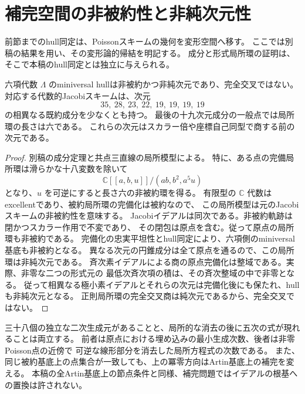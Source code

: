 \section{補完空間の非被約性と非純次元性}
\label{sec:ambient-geometry-consequences-v32}

前節までのhull同定は、Poissonスキームの幾何を変形空間へ移す。
ここでは別稿\cite{VKPoisson32}の結果を用い、その変形論的帰結を明記する。
成分と形式局所環の証明は、そこで本稿のhull同定とは独立に与えられる。

\begin{corollary}[非被約な六項補完空間]
\label{cor:ambient-nonreduced-v32}
六項代数 $\Lambda$ のminiversal hullは非被約かつ非純次元であり、完全交叉ではない。
対応する代数的Jacobiスキームは、次元
\[
 35,\ 28,\ 23,\ 22,\ 19,\ 19,\ 19,\ 19
\]
の相異なる既約成分を少なくとも持つ。
最後の十九次元成分の一般点では局所環の長さは六である。
これらの次元はスカラー倍や座標自己同型で商する前の次元である。
\end{corollary}

\begin{proof}
別稿の成分定理と共点三直線の局所模型による。
特に、ある点の完備局所環は滑らかな十八変数を除いて
\[
 \mathbb C[[a,b,u]]/(ab,b^2,a^5u)
\]
となり、$u$ を可逆にすると長さ六の非被約環を得る。
有限型の $\mathbb C$ 代数はexcellentであり、被約局所環の完備化は被約なので、
この局所模型は元のJacobiスキームの非被約性を意味する。
Jacobiイデアルは同次である。非被約軌跡は閉かつスカラー作用で不変であり、
その閉包は原点を含む。従って原点の局所環も非被約である。
完備化の忠実平坦性とhull同定により、六項側のminiversal基底も非被約となる。
異なる次元の円錐成分は全て原点を通るので、この局所環は非純次元である。
斉次素イデアルによる商の原点完備化は整域である。実際、非零な二つの形式元の
最低次斉次項の積は、その斉次整域の中で非零となる。
従って相異なる極小素イデアルとそれらの次元は完備化後にも保たれ、hullも非純次元となる。
正則局所環の完全交叉商は純次元であるから、完全交叉ではない。
\end{proof}

三十八個の独立な二次生成元があることと、局所的な消去の後に五次の式が現れることは両立する。
前者は原点における埋め込みの最小生成次数、後者は非零Poisson点の近傍で
可逆な線形部分を消去した局所方程式の次数である。
また、同じ被約基底上の点集合が一致しても、上の冪零方向はArtin基底上の補完を変える。
本稿の全Artin基底上の節点条件と同様、補完問題ではイデアルの根基への置換は許されない。
